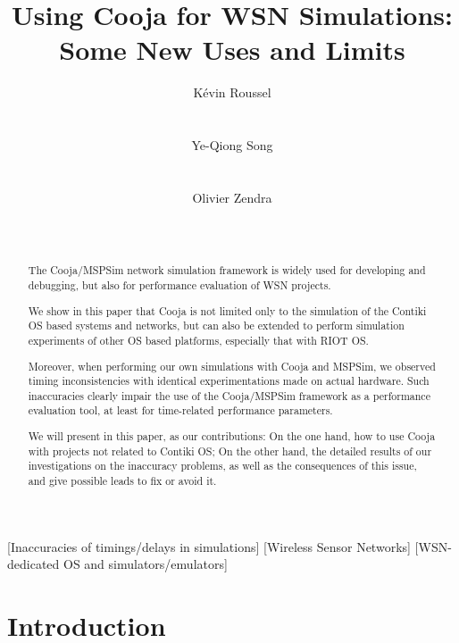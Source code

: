 \documentclass[10pt,emptycopyrightspace]{ewsn-proc}
\author{
\alignauthor K\'evin Roussel \\
        \affaddr{INRIA Nancy Grand-Est}\\
        \affaddr{615, rue du Jardin Botanique}\\
        \affaddr{54600 Villers-l\`es-Nancy, France}
       \email{kevin.roussel@inria.fr}
\alignauthor Ye-Qiong Song \\
        \affaddr{LORIA/INRIA Nancy Grand-Est}\\
        \affaddr{615, rue du Jardin Botanique}\\
        \affaddr{54600 Villers-l\`es-Nancy, France}
       \email{ye-qiong.song@loria.fr}
\alignauthor Olivier Zendra \\
        \affaddr{INRIA Nancy Grand-Est}\\
        \affaddr{615, rue du Jardin Botanique}\\
        \affaddr{54600 Villers-l\`es-Nancy, France}
       \email{olivier.zendra@inria.fr}
}
\title{Using Cooja for WSN Simulations: Some New Uses and Limits}
\begin{document}
\maketitle


\begin{abstract}
The Cooja/MSPSim network simulation framework is widely used for developing
and debugging, but also for performance evaluation of WSN projects.

We show in this paper that Cooja is not limited only to the simulation
of the Contiki OS based systems and networks, but can also be extended 
to perform simulation experiments of other OS based platforms, especially
that with RIOT OS.

Moreover, when performing our own simulations with Cooja and MSPSim,
we observed timing inconsistencies with identical experimentations made
on actual hardware. Such inaccuracies clearly impair the use of the
Cooja/MSPSim framework as a performance evaluation tool, at least
for time-related performance parameters.

We will present in this paper, as our contributions: On the one hand,
how to use Cooja with projects not related to Contiki OS;
On the other hand, the detailed results of our investigations on the
inaccuracy problems, as well as the consequences of this issue, and give
possible leads to fix or avoid it.
\end{abstract}

\medskip

               [Inaccuracies of timings/delays in simulations]
               [Wireless Sensor Networks]
               [WSN-dedicated OS and simulators/emulators]



\medskip


\section{Introduction}
\label{introduction}
\end{document}
